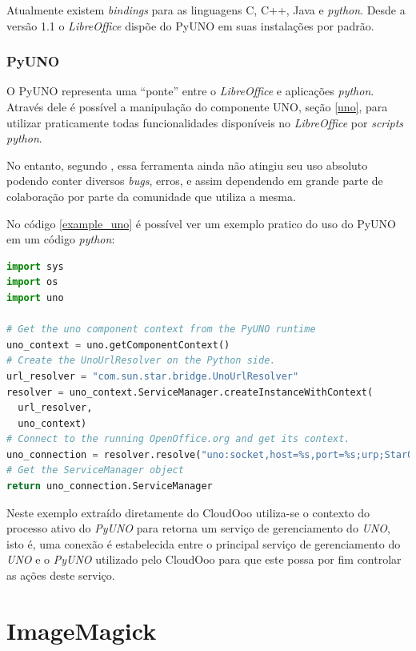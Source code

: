 Atualmente existem \textit{bindings} para as linguagens C, C++, Java e \textit{python}. Desde a versão 1.1 o \textit{LibreOffice} dispõe do PyUNO em suas instalações por padrão.

\subsubsection{PyUNO}
\label{pyuno}

O PyUNO representa uma ``ponte'' entre o \textit{LibreOffice} e aplicações \textit{python}. Através dele é possível a manipulação do componente UNO, seção \ref{uno}, para utilizar praticamente todas funcionalidades disponíveis no \textit{LibreOffice} por \textit{scripts python}.

No entanto, segundo \cite{PYUNO}, essa ferramenta ainda não atingiu seu uso absoluto podendo conter diversos \textit{bugs}, erros, e assim dependendo em grande parte de colaboração por parte da comunidade que utiliza a mesma.

No código \ref{example_uno} é possível ver um exemplo pratico do uso do PyUNO em um código \textit{python}:

{\singlespace
\begin{lstlisting}[caption=Exemplo de uso do Uno,language=python,label={example_uno}]
import sys
import os
import uno

# Get the uno component context from the PyUNO runtime
uno_context = uno.getComponentContext()
# Create the UnoUrlResolver on the Python side.
url_resolver = "com.sun.star.bridge.UnoUrlResolver"
resolver = uno_context.ServiceManager.createInstanceWithContext(
  url_resolver,
  uno_context)
# Connect to the running OpenOffice.org and get its context.
uno_connection = resolver.resolve("uno:socket,host=%s,port=%s;urp;StarOffice.ComponentContext" % (host, port))
# Get the ServiceManager object
return uno_connection.ServiceManager
\end{lstlisting}
}

Neste exemplo extraído diretamente do CloudOoo utiliza-se o contexto do processo ativo do \textit{PyUNO} para retorna um serviço de gerenciamento do \textit{UNO}, isto é, uma conexão é estabelecida entre o principal serviço de gerenciamento do \textit{UNO} e o \textit{PyUNO} utilizado pelo CloudOoo para que este possa por fim controlar as ações deste serviço.


\section{ImageMagick}
\label{imagemagick}

